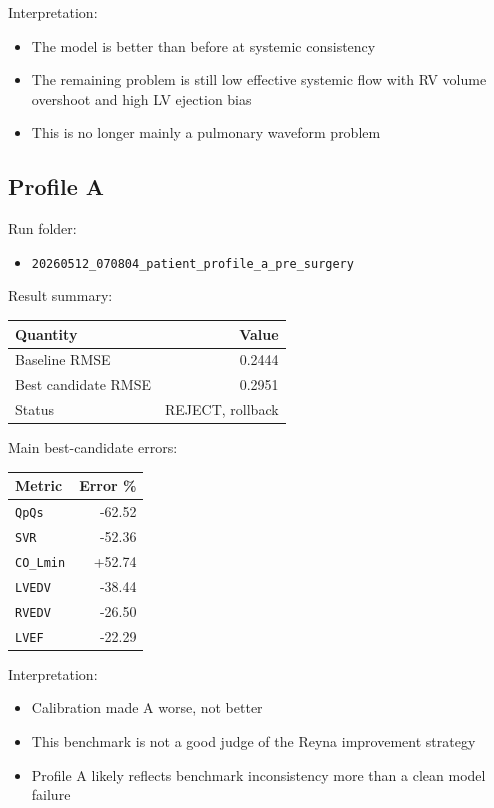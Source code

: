 \documentclass[11pt,a4paper]{article}
\begin{document}
Interpretation:

\begin{itemize}[leftmargin=1.5em]
    \item The model is better than before at systemic consistency
    \item The remaining problem is still low effective systemic flow with RV
    volume overshoot and high LV ejection bias
    \item This is no longer mainly a pulmonary waveform problem
\end{itemize}

\subsection{Profile A}

Run folder:

\begin{itemize}[leftmargin=1.5em]
    \item \texttt{20260512\_070804\_patient\_profile\_a\_pre\_surgery}
\end{itemize}

Result summary:

\begin{tabular}{lr}
\toprule
Quantity & Value \\
\midrule
Baseline RMSE & 0.2444 \\
Best candidate RMSE & 0.2951 \\
Status & REJECT, rollback \\
\bottomrule
\end{tabular}

Main best-candidate errors:

\begin{tabular}{lr}
\toprule
Metric & Error \% \\
\midrule
\texttt{QpQs} & -62.52 \\
\texttt{SVR} & -52.36 \\
\texttt{CO\_Lmin} & +52.74 \\
\texttt{LVEDV} & -38.44 \\
\texttt{RVEDV} & -26.50 \\
\texttt{LVEF} & -22.29 \\
\bottomrule
\end{tabular}

Interpretation:

\begin{itemize}[leftmargin=1.5em]
    \item Calibration made A worse, not better
    \item This benchmark is not a good judge of the Reyna improvement strategy
    \item Profile A likely reflects benchmark inconsistency more than a clean
    model failure
\end{itemize}
\end{document}
